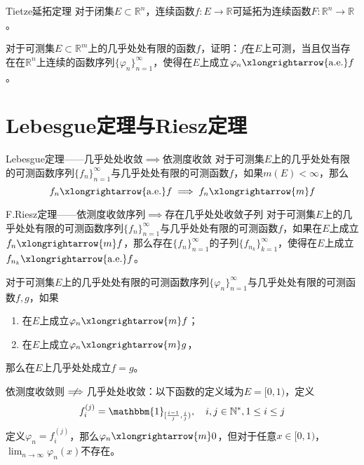 \documentclass[lang = cn, scheme = chinese, thmcnt = section]{elegantbook}
\newcommand{\N}{\mathbb{N}}            %
\newcommand{\R}{\mathbb{R}}            %
\newcommand{\sub}{\subset}             %
\newcommand{\dis}{\displaystyle}
\newcommand{\toae}{\xlongrightarrow{\mathrm{a.e.}}}
\newcommand{\tom}{\xlongrightarrow{m}}
\begin{document}
\begin{theorem}{Tietze延拓定理}
	对于闭集$E\sub\R^n$，连续函数$f:E\to\R$可延拓为连续函数$F:\R^n\to\R$。
\end{theorem}

\begin{exercise}
	对于可测集$E\sub\R^m$上的几乎处处有限的函数$f$，证明：$f$在$E$上可测，当且仅当存在在$\R^n$上连续的函数序列$\{ \varphi_n \}_{n=1}^{\infty}$，使得在$E$上成立$\varphi_n\toae f$。
\end{exercise}

\section{Lebesgue定理与Riesz定理}

\begin{theorem}{Lebesgue定理——几乎处处收敛$\implies$依测度收敛}
	对于可测集$E$上的几乎处处有限的可测函数序列$\{f_n\}_{n=1}^{\infty}$与几乎处处有限的可测函数$f$，如果$m(E)<\infty$，那么
	$$
	f_n\toae f\implies
	f_n\tom f
	$$
\end{theorem}

\begin{theorem}{F.Riesz定理——依测度收敛序列$\implies$存在几乎处处收敛子列}
	对于可测集$E$上的几乎处处有限的可测函数序列$\{f_n\}_{n=1}^{\infty}$与几乎处处有限的可测函数$f$，如果在$E$上成立$f_n\tom f$，那么存在$\{f_n\}_{n=1}^{\infty}$的子列$\{f_{n_k}\}_{k=1}^{\infty}$，使得在$E$上成立$f_{n_k}\toae f$。
\end{theorem}

\begin{corollary}
	对于可测集$E$上的几乎处处有限的可测函数序列$\{\varphi_n\}_{n=1}^{\infty}$与几乎处处有限的可测函数$f,g$，如果
	\begin{enumerate}
		\item 在$E$上成立$\varphi_n\tom f$；
		\item 在$E$上成立$\varphi_n\tom g$，
	\end{enumerate}
	那么在$E$上几乎处处成立$f=g$。
\end{corollary}

\begin{note}
	依测度收敛则$\centernot\implies$几乎处处收敛：以下函数的定义域为$E=[0,1)$，定义
	$$
	f_i^{(j)}=\mathbbm{1}_{[ \frac{i-1}{j},\frac{i}{j} )},\quad i,j\in\N^*,1\le i\le j
	$$
	定义$\varphi_n=f_i^{(j)}$，那么$\varphi_n\tom 0$，但对于任意$x\in[0,1)$，$\dis\lim_{n\to\infty} \varphi_n(x)$不存在。
\end{note}
\end{document}
